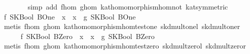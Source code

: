 \begin{isabellebody}
\ \ \ \ \ \ \isamarkupfalse%
\ {}simp\ add{}\ f{}hom\ g{}hom\ kat{}homomorphism{}hom{}not\ kat{}{}symmetric{}{}\isanewline
\ \ \isamarkupfalse%
\isanewline
\ \ \ \ \isamarkupfalse%
\ {}f\ {}SKBool\ BOne{}\ {}\ x\ {}\ x\ {}\ g\ {}SKBool\ BOne{}{}\isanewline
\ \ \ \ \ \ \isamarkupfalse%
\ {}metis\ f{}hom\ g{}hom\ kat{}homomorphism{}hom{}test{}one\ skd{}mult{}onel\ skd{}mult{}oner{}\isanewline
\ \ \isamarkupfalse%
\isanewline
\ \ \ \ \isamarkupfalse%
\ {}f\ {}SKBool\ BZero{}\ {}\ x\ {}\ x\ {}\ g\ {}SKBool\ BZero{}{}\isanewline
\ \ \ \ \ \ \isamarkupfalse%
\ {}metis\ f{}hom\ g{}hom\ kat{}homomorphism{}hom{}test{}zero\ skd{}mult{}zerol\ skd{}mult{}zeror{}\isanewline
\ \ \isamarkupfalse%

\end{isabellebody}

